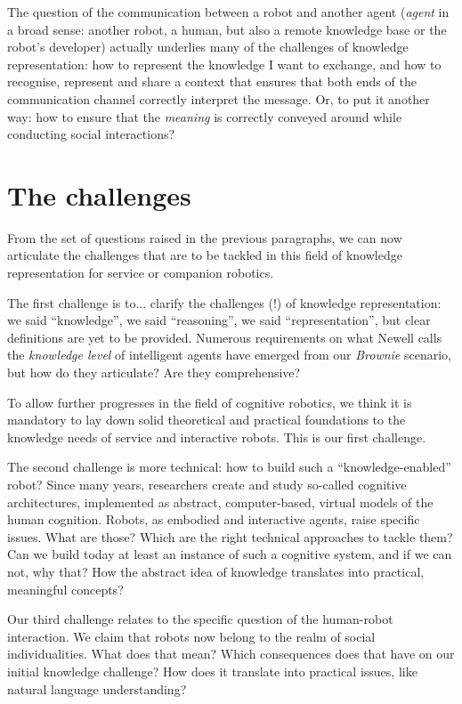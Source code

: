 The question of the communication between a robot and another agent
(\emph{agent} in a broad sense: another robot, a human, but also a remote
knowledge base or the robot's developer) actually underlies many of the
challenges of knowledge representation: how to represent the knowledge I want
to exchange, and how to recognise, represent and share a context that ensures
that both ends of the communication channel correctly interpret the message.
Or, to put it another way: how to ensure that the \emph{meaning} is correctly
conveyed around while conducting social interactions?


\section{The challenges}
\label{sect|challenges}

From the set of questions raised in the previous paragraphs, we can now
articulate the challenges that are to be tackled in this field of knowledge
representation for service or companion robotics.

The first challenge is to... clarify the challenges (!) of knowledge
representation: we said ``knowledge'', we said ``reasoning'', we said
``representation'', but clear definitions are yet to be provided. Numerous
requirements on what Newell calls the \emph{knowledge level} of intelligent
agents have emerged from our \emph{Brownie} scenario, but how do they
articulate? Are they comprehensive?

To allow further progresses in the field of cognitive robotics, we think
it is mandatory to lay down solid theoretical and practical foundations to the
knowledge needs of service and interactive robots. This is our first challenge.

The second challenge is more technical: how to build such a
``knowledge-enabled'' robot? Since many years, researchers create and study
so-called cognitive architectures, implemented as abstract, computer-based,
virtual models of the human cognition. Robots, as embodied and interactive
agents, raise specific issues. What are those? Which are the right technical
approaches to tackle them? Can we build today at least an instance of such a
cognitive system, and if we can not, why that? How the abstract idea of
knowledge translates into practical, meaningful concepts?

Our third challenge relates to the specific question of the human-robot
interaction. We claim that robots now belong to the realm of social
individualities. What does that mean? Which consequences does that have on our
initial knowledge challenge? How does it translate into practical issues, like
natural language understanding?

